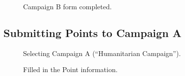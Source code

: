 \documentclass{article}
\begin{document}
		\begin{figure}[ht]
			\centering
			\caption{Campaign B form completed.}
			\label{fig:eval-cb-1}
		\end{figure}

		\FloatBarrier
		\subsection{Submitting Points to Campaign A}

		\begin{figure}[ht]
			\centering
			\caption{Selecting Campaign A (``Humanitarian Campaign'').}
			\label{fig:eval-submita-1}
		\end{figure}

		\begin{figure}[ht]
			\centering
			\caption{Filled in the Point information.}
			\label{fig:eval-submita-2}
		\end{figure}
\end{document}
